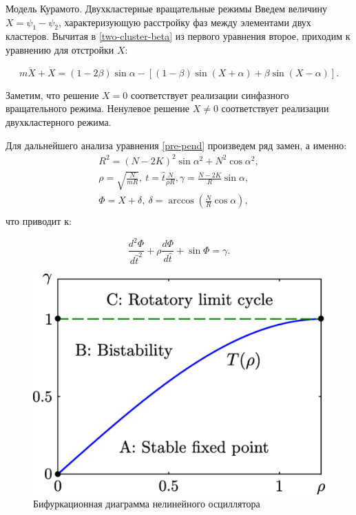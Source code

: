 \begin{chapter}{Модель Курамото. Двухкластерные вращательные режимы}
	Введем величину $X = \psi_1 - \psi_2$, характеризующую расстройку фаз между элементами двух кластеров.
	Вычитая в \eqref{two-cluster-beta} из первого уравнения второе, приходим к уравнению для отстройки $X$:

	\begin{equation} \label{pre-pend}
		m\ddot{X} + \dot{X} = (1 - 2 \beta) \sin{\alpha} - \left[(1-\beta)\sin{(X + \alpha)} + \beta\sin{(X - \alpha)} \right].
	\end{equation}
	
	Заметим, что решение $X = 0$ соответствует реализации
	синфазного вращательного режима. Ненулевое решение $X \neq 0$ соответствует
	реализации двухкластерного режима.
	
	
	Для дальнейшего анализа уравнения \eqref{pre-pend} произведем ряд замен, а именно:
	\begin{align*}
	R^2 = (N - 2K)^2 \sin{\alpha}^2 + N^2 \cos{\alpha}^2, \\
	\rho = \sqrt{\frac{N}{m R}}, \ t = \hat{t} \frac{N}{\rho R}, \gamma = \frac{N - 2K}{R}\sin{\alpha}, \\
	\Phi = X + \delta, \ \delta = \arccos{(\frac{N}{R}\cos{\alpha})}, \\
	\end{align*}
	что приводит к:
	
	\begin{equation} \label{pend}
		\frac{d^2 \Phi }{d\hat{t}^2} + \rho \frac{d\Phi}{d\hat{t}} + \sin{\Phi} = \gamma.
	\end{equation}

	\begin{figure}[h!]
		\begin{center}
			\includegraphics[width=0.7\columnwidth]{pictures/bf-tricommy.png}
		\end{center}
		\caption{Бифуркационная диаграмма нелинейного осциллятора}
		\label{bf-d}
	\end{figure}


\end{chapter}
